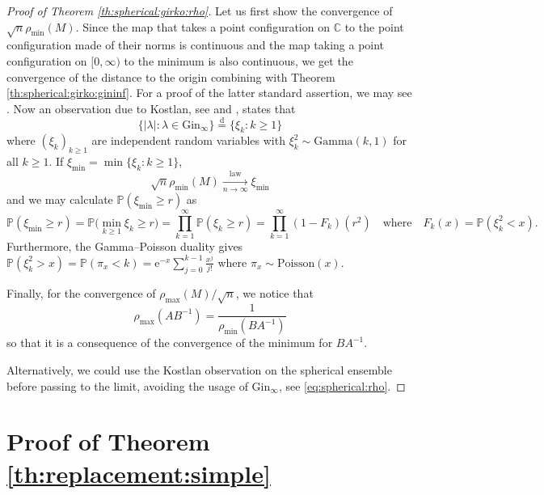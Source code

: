 \documentclass[10pt,reqno]{amsart}
\newcommand{\dd}{\mathrm{d}}
\newcommand{\<}{\langle}
\renewcommand{\>}{\rangle}
\numberwithin{equation}{section}
\begin{document}
\begin{proof}[Proof of Theorem \ref{th:spherical:girko:rho}]


Let us first show the convergence of $\sqrt n\rho_{\mathrm{min}}(M)$.
Since the map that takes a point configuration on $\mathbb C$ to 
the point configuration made of their norms is continuous and the map
taking a point configuration on $[0,\infty)$ to
the minimum is also continuous, we get the convergence of
the distance to the origin combining with Theorem \ref{th:spherical:girko:gininf}. For a proof of the latter standard
assertion, we may see \cite[Lemma A.1]{zbMATH07493826}. 
Now an observation due to Kostlan, see \cite{MR1148410} and \cite[Th.~4.7.3 and Sec.~7.2]{MR2552864}, states that 
\begin{equation}\label{eq:kostlan:gininf}
\{|\lambda|:\lambda\in\mathrm{Gin}_\infty\}
\overset{\dd}{=}
\{\xi_k:k\geq1\}
\end{equation}
where ${(\xi_k)}_{k\geq1}$ are independent random variables with $\xi_k^2\sim\mathrm{Gamma}(k,1)$ for all $k\geq1$. 
If $\xi_{\min} = \min \{\xi_k: k \geq 1\}$,
\[\sqrt n \rho_{\min}(M) \xrightarrow[n \to \infty]{\mathrm{law}} \xi_{\min} \]
and we may calculate $\mathbb P (\xi_{\min} \geq r)$ as
\[\mathbb P (\xi_{\min} \geq r)
=\mathbb{P}\Bigr(\min_{k\geq1}\xi_k\geq r\Bigr)
=\prod_{k=1}^\infty\mathbb{P}(\xi_k\geq r)
=\prod_{k=1}^\infty(1-F_k)(r^2)
\quad\text{where}\quad
F_k(x)=\mathbb{P}(\xi_k^2<x).
\]
Furthermore, the Gamma--Poisson duality gives
$\mathbb{P}(\xi_k^2>x)=\mathbb{P}(\pi_x<k)=\mathrm{e}^{-x}\sum_{j=0}^{k-1}\frac{x^j}{j!}$ where $\pi_x\sim\mathrm{Poisson}(x)$.

Finally, for the convergence of $\rho_{\max}(M)/\sqrt n$,
we notice that
\[\rho_{\max}(AB^{-1}) = \frac{1}{\rho_{\min}(BA^{-1})}\]
so that it is a consequence of the convergence of the minimum
for $BA^{-1}$.

Alternatively, we could use the Kostlan observation on the spherical ensemble before passing to the limit, avoiding the usage of $\mathrm{Gin}_\infty$, see \eqref{eq:spherical:rho}.
\end{proof}

%
\section{Proof of Theorem \ref{th:replacement:simple}}
\label{se:proof:th:replacement:simple}
%
\end{document}
